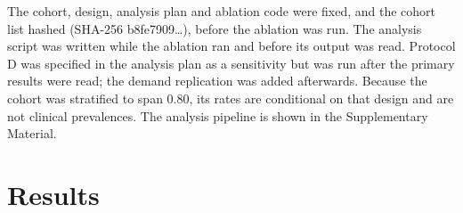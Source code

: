 \documentclass[journal]{IEEEtran}
\begin{document}
The cohort, design, analysis plan and ablation code were fixed, and the cohort list hashed (SHA-256 b8fe7909\ldots),
before the ablation was run. The analysis script was written while the ablation ran and before its output was read.
Protocol D was specified in the analysis plan as a sensitivity but was run after the primary results were read; the
demand replication was added afterwards. Because the cohort was stratified to span 0.80, its rates are conditional
on that design and are not clinical prevalences. The analysis pipeline is shown in the Supplementary Material.

\section{Results}
\end{document}

